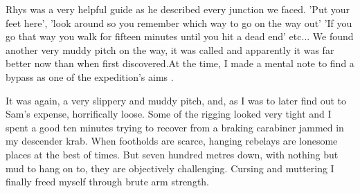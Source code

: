 \begin{figure}[b!]
\end{figure}

Rhys was a very helpful guide as he described every junction we faced. 'Put your feet here', 'look around so you remember which way to go on the way out' 'If you go that way you walk for fifteen minutes until you hit a dead end' etc... We found another very muddy pitch on the way,  it was called and apparently it was far better now than when first discovered.At the time, I made a mental note to find a bypass as one of the expedition's aims . 


It was again, a very slippery and muddy pitch, and, as I was to later find out to Sam's expense, horrifically loose. Some of the rigging looked very tight and I spent a good ten minutes trying to recover from a braking carabiner jammed in my descender krab. When footholds are scarce, hanging rebelays are lonesome places at the best of times. But seven hundred metres down, with nothing but mud to hang on to, they are objectively challenging. Cursing and muttering I finally freed myself through brute arm strength.

